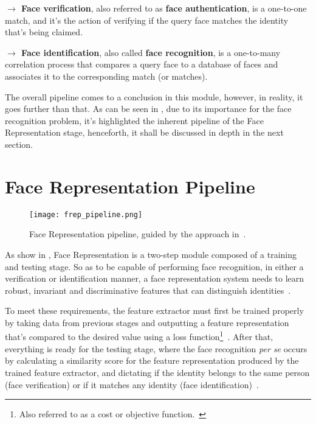 \documentclass[class=report, crop=false, a4paper, 12pt]{standalone}
\begin{document}
\vspace{0.7\baselineskip}
\noindent\textbf{$\rightarrow$ Face verification}, also referred to as \textbf{face authentication}, is a one-to-one match, and it's the action of verifying if the query face matches the identity that's being claimed. ~\autocite{liHandbookFaceRecognition2011}

\vspace{0.7\baselineskip}
\noindent\textbf{$\rightarrow$ Face identification}, also called \textbf{face recognition}, is a one-to-many correlation process that compares a query face to a database of faces and associates it to the corresponding match (or matches). ~\autocite{liHandbookFaceRecognition2011}



\vspace{0.7\baselineskip}
\par The overall pipeline comes to a conclusion in this module, however, in reality, it goes further than that. As can be seen in , due to its importance for the face recognition problem, it's highlighted the inherent pipeline of the Face Representation stage, henceforth, it shall be discussed in depth in the next section.

\newpage
\section{Face Representation Pipeline}
\begin{figure}[!h]
    \centering
    \texttt{[image: frep\_pipeline.png]}
    \caption[Pipeline]{Face Representation pipeline, guided by the approach in~\autocite{wangDeepFaceRecognition2021}.}
    \label{fig:frep pipeline}
\end{figure}

\par As show in , Face Representation is a two-step module composed of a training and testing stage. So as to be capable of performing face recognition, in either a verification or identification manner, a face representation system needs to learn robust, invariant and discriminative features that can distinguish identities~\autocite{ranjanDeepLearningUnderstanding2018}. 
\par To meet these requirements, the feature extractor must first be trained properly by taking data from previous stages and outputting a feature representation that's compared to the desired value using a loss function\footnote{Also referred to as a cost or objective function.~\autocite{lecunDeepLearning2015}}~\autocite{lecunDeepLearning2015, wangDeepFaceRecognition2021}. After that, everything is ready for the testing stage, where the face recognition \textit{per se} occurs by calculating a similarity score for the feature representation produced by the trained feature extractor, and dictating if the identity belongs to the same person (face verification) or if it matches any identity (face identification)~\autocite{ranjanDeepLearningUnderstanding2018}.
\end{document}
